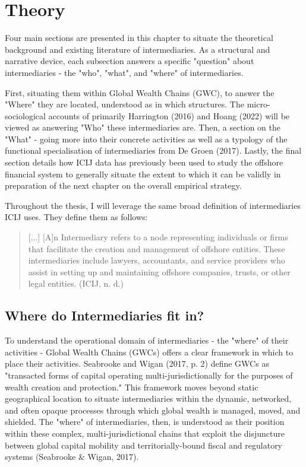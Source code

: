 \chapter{Theory}
\label{chap:theory}

Four main sections are presented in this chapter to situate the theoretical background and existing literature of intermediaries. As a structural and narrative device, each subsection answers a specific "question" about intermediaries - the "who", "what", and "where" of intermediaries. 

First, situating them within Global Wealth Chains (GWC), to answer the "Where" they are located, understood as in which structures. The micro-sociological accounts of primarily Harrington (2016) and Hoang (2022) will be viewed as answering "Who" these intermediaries are. Then, a section on the "What" - going more into their concrete activities as well as a typology of the functional specialisation of intermediaries from De Groen (2017). Lastly, the final section details how ICIJ data has previously been used to study the offshore financial system to generally situate the extent to which it can be validly in preparation of the next chapter on the overall empirical strategy.

Throughout the thesis, I will leverage the same broad definition of intermediaries ICIJ uses. They define them as follows:

\begin{quote}
    [...] [A]n Intermediary refers to a node representing individuals or firms that facilitate the creation and management of offshore entities. These intermediaries include lawyers, accountants, and service providers who assist in setting up and maintaining offshore companies, trusts, or other legal entities. (ICIJ, n. d.)
\end{quote}


\section{Where do Intermediaries fit in?}

To understand the operational domain of intermediaries - the "where" of their activities - Global Wealth Chains (GWCs) offers a clear framework in which to place their activities. Seabrooke and Wigan (2017, p. 2) define GWCs as "transacted forms of capital operating multi-jurisdictionally for the purposes of wealth creation and protection." This framework moves beyond static geographical location to situate intermediaries within the dynamic, networked, and often opaque processes through which global wealth is managed, moved, and shielded. The "where" of intermediaries, then, is understood as their position within these complex, multi-jurisdictional chains that exploit the disjuncture between global capital mobility and territorially-bound fiscal and regulatory systems (Seabrooke \& Wigan, 2017).

